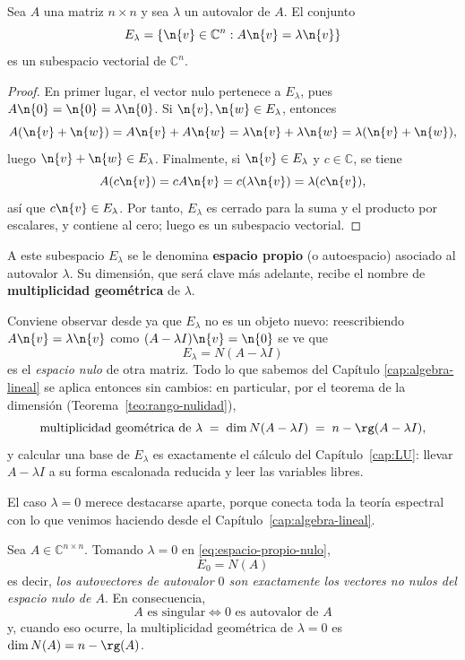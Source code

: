 \begin{thm}
  
Sea $A$ una matriz $n\times n$ y sea $\lambda$ un autovalor de $A$. El conjunto
\[
E_\lambda = \{ \n{v} \in \mathbb{C}^n : A\n{v} = \lambda \n{v} \}
\]
es un subespacio vectorial de $\mathbb{C}^n$.
\end{thm}

\begin{proof}
En primer lugar, el vector nulo pertenece a $E_\lambda$, pues $A\n{0} = \n{0} = \lambda \n{0}$. Si $\n{v}, \n{w} \in E_\lambda$, entonces
\[
A(\n{v}+\n{w}) = A\n{v} + A\n{w} = \lambda \n{v} + \lambda \n{w} = \lambda (\n{v}+\n{w}),
\]
luego $\n{v}+\n{w} \in E_\lambda$. Finalmente, si $\n{v}\in E_\lambda$ y $c\in\mathbb{C}$, se tiene
\[
A(c\n{v}) = c A\n{v} = c(\lambda \n{v}) = \lambda (c\n{v}),
\]
así que $c\n{v}\in E_\lambda$. Por tanto, $E_\lambda$ es cerrado para la suma y el producto por escalares, y contiene al cero; luego es un subespacio vectorial.
\end{proof}

A este subespacio $E_\lambda$ se le denomina \textbf{espacio propio} (o autoespacio)
asociado al autovalor $\lambda$. Su dimensión, que será clave más adelante, recibe el
nombre de \textbf{multiplicidad geométrica} de $\lambda$.

Conviene observar desde ya que $E_\lambda$ no es un objeto nuevo: reescribiendo
$A\n{v}=\lambda\n{v}$ como $(A-\lambda I)\n{v}=\n{0}$ se ve que
\begin{equation}\label{eq:espacio-propio-nulo}
\boxed{\ E_\lambda = N(A-\lambda I)\ }
\end{equation}
es el \emph{espacio nulo} de otra matriz. Todo lo que sabemos del Capítulo
\ref{cap:algebra-lineal} se aplica entonces sin cambios: en particular, por el teorema
de la dimensión (Teorema~\ref{teo:rango-nulidad}),
\[
\text{multiplicidad geométrica de }\lambda \;=\; \dim N(A-\lambda I)
\;=\; n-\rg(A-\lambda I),
\]
y calcular una base de $E_\lambda$ es exactamente el cálculo del Capítulo~\ref{cap:LU}:
llevar $A-\lambda I$ a su forma escalonada reducida y leer las variables libres.

El caso $\lambda=0$ merece destacarse aparte, porque conecta toda la teoría espectral
con lo que venimos haciendo desde el Capítulo~\ref{cap:algebra-lineal}.

\begin{coro}\label{coro:lambda-cero}
Sea $A\in\mathbb{C}^{n\times n}$. Tomando $\lambda=0$ en
\eqref{eq:espacio-propio-nulo},
\[
\boxed{\ E_0 = N(A)\ }
\]
es decir, \emph{los autovectores de autovalor $0$ son exactamente los vectores no nulos
del espacio nulo de $A$}. En consecuencia,
\[
\boxed{\ A \text{ es singular} \iff 0 \text{ es autovalor de } A\ }
\]
y, cuando eso ocurre, la multiplicidad geométrica de $\lambda=0$ es
$\dim N(A) = n-\rg(A)$.
\end{coro}

